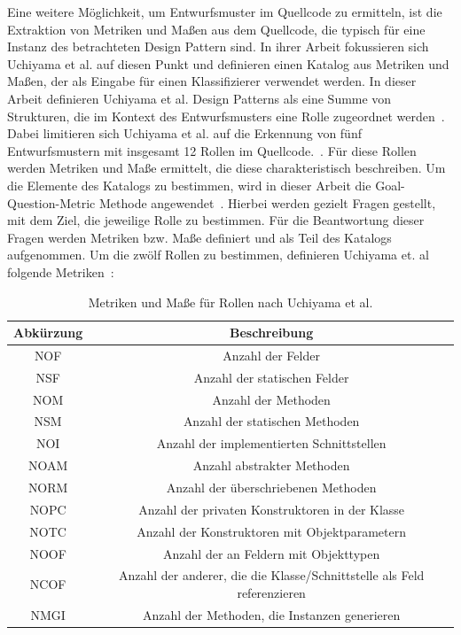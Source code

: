 Eine weitere Möglichkeit, um Entwurfsmuster im Quellcode zu ermitteln, ist die Extraktion von Metriken und Maßen aus dem Quellcode, die typisch für eine Instanz des betrachteten Design Pattern sind.
In ihrer Arbeit fokussieren sich Uchiyama et al. auf diesen Punkt und definieren einen Katalog aus Metriken und Maßen, der als Eingabe für einen Klassifizierer verwendet werden.
In dieser Arbeit definieren Uchiyama et al. Design Patterns als eine Summe von Strukturen, die im Kontext des Entwurfsmusters eine Rolle zugeordnet werden~\cite[S. 3]{Uchiyama2014}.
Dabei limitieren sich Uchiyama et al. auf die Erkennung von fünf Entwurfsmustern mit insgesamt 12 Rollen im Quellcode.~\cite[S. 4]{Uchiyama2014}.
Für diese Rollen werden Metriken und Maße ermittelt, die diese charakteristisch beschreiben.
Um die Elemente des Katalogs zu bestimmen, wird in dieser Arbeit die Goal-Question-Metric Methode angewendet~\cite[S. 4]{Uchiyama2014}.
Hierbei werden gezielt Fragen gestellt, mit dem Ziel, die jeweilige Rolle zu bestimmen. Für die Beantwortung dieser Fragen werden Metriken bzw. Maße definiert und als Teil des Katalogs aufgenommen.
Um die zwölf Rollen zu bestimmen, definieren Uchiyama et. al folgende Metriken~\cite[S. 7]{Uchiyama2014}:


\begin{table}[H]
    \centering
    \begin{tabular}{|c|c|}
        \hline
        Abkürzung & Beschreibung\\
        \hline
        NOF & Anzahl der Felder\\
        NSF & Anzahl der statischen Felder\\
        NOM & Anzahl der Methoden\\
        NSM & Anzahl der statischen Methoden\\
        NOI & Anzahl der implementierten Schnittstellen\\
        NOAM & Anzahl abstrakter Methoden\\
        NORM & Anzahl der überschriebenen Methoden\\
        NOPC & Anzahl der privaten Konstruktoren in der Klasse\\
        NOTC & Anzahl der Konstruktoren mit Objektparametern\\
        NOOF & Anzahl der an Feldern mit Objekttypen\\
        NCOF & Anzahl der anderer, die die Klasse/Schnittstelle als Feld referenzieren\\
        NMGI & Anzahl der Methoden, die Instanzen generieren\\
        \hline 
    \end{tabular}
    \caption{Metriken und Maße für Rollen nach Uchiyama et al.}
    \label{table:metrics}
\end{table}

